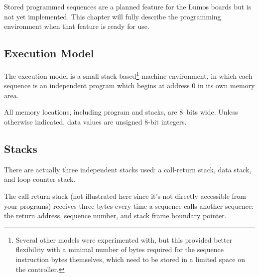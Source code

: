 \documentclass[letterpaper,twoside,onecolumn,openright,final]{memoir}
\begin{document}
\begin{NotImplemented*}{Stored programmed sequences are a planned feature for the Lumos boards but is not
yet implemented.  This chapter will fully describe the programming environment when that feature is
ready for use.}
\subsection{Execution Model}
The execution model is a small stack-based\footnote{Several other
models were experimented with, but this provided better flexibility with a minimal
number of bytes required for the sequence instruction bytes themselves, which need to
be stored in a limited space on the controller.} 
machine environment, in which
each sequence is an independent program which begins at
address 0 in its own memory area.  

All memory locations, including program and stacks, are 8~bits wide.  Unless otherwise
indicated, data values are unsigned 8-bit integers.

\subsection{Stacks}
There are actually three independent stacks used: a call-return stack, data stack, and loop
counter stack.

The call-return stack (not illustrated here since it's not directly accessible from your programs) 
receives three bytes every time a sequence calls another sequence: the return address, sequence number,
and stack frame boundary pointer.


\end{NotImplemented*}
\end{document}
